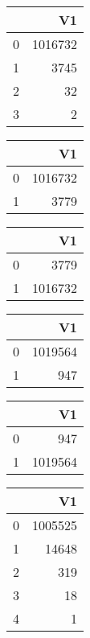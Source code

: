 \bigskip\bigskip
\centering
\begin{tabular}{rr}
  \hline
 & V1 \\ 
  \hline
0 & 1016732 \\ 
  1 & 3745 \\ 
  2 &  32 \\ 
  3 &   2 \\ 
   \hline
\end{tabular}

\bigskip\bigskip
\centering
\begin{tabular}{rr}
  \hline
 & V1 \\ 
  \hline
0 & 1016732 \\ 
  1 & 3779 \\ 
   \hline
\end{tabular}

\bigskip\bigskip
\centering
\begin{tabular}{rr}
  \hline
 & V1 \\ 
  \hline
0 & 3779 \\ 
  1 & 1016732 \\ 
   \hline
\end{tabular}

\bigskip\bigskip
\centering
\begin{tabular}{rr}
  \hline
 & V1 \\ 
  \hline
0 & 1019564 \\ 
  1 & 947 \\ 
   \hline
\end{tabular}

\bigskip\bigskip
\centering
\begin{tabular}{rr}
  \hline
 & V1 \\ 
  \hline
0 & 947 \\ 
  1 & 1019564 \\ 
   \hline
\end{tabular}

\bigskip\bigskip
\centering
\begin{tabular}{rr}
  \hline
 & V1 \\ 
  \hline
0 & 1005525 \\ 
  1 & 14648 \\ 
  2 & 319 \\ 
  3 &  18 \\ 
  4 &   1 \\ 
   \hline
\end{tabular}

